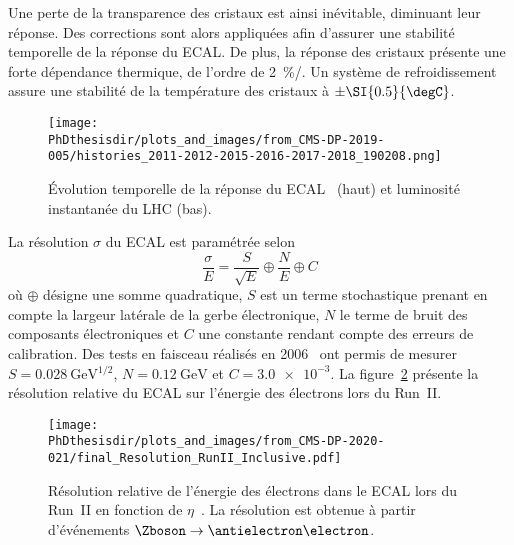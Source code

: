 Une perte de la transparence des cristaux est ainsi inévitable, diminuant leur réponse.
Des corrections sont alors appliquées afin d'assurer une stabilité temporelle de la réponse du ECAL.
De plus, la réponse des cristaux présente une forte dépendance thermique, de l'ordre de \SI{2}{\%/\degC}.
Un système de refroidissement assure une stabilité de la température des cristaux à $\pm\SI{0.5}{\degC}$.
\begin{figure}[h]
\centering
\texttt{[image: \\PhDthesisdir/plots\_and\_images/from\_CMS-DP-2019-005/histories\_2011-2012-2015-2016-2017-2018\_190208.png]}
\caption[Évolution temporelle de la réponse du ECAL.]{Évolution temporelle de la réponse du ECAL~\cite{CMS-DP-2019-005} (haut) et luminosité instantanée du LHC (bas).}
\label{fig-chapter-LHC-section-CMS-subsec-ECAL-CMS-DP-2019-005-histories_2011-2012-2015-2016-2017-2018_190208}
\end{figure}
\par La résolution $\sigma$ du ECAL est paramétrée selon
\begin{equation}
\frac{\sigma}{E}
=
\frac{S}{\sqrt{E}}
\oplus
\frac{N}{E}
\oplus
C
\end{equation}
où $\oplus$ désigne une somme quadratique,
$S$ est un terme stochastique prenant en compte la largeur latérale de la gerbe électronique,
$N$ le terme de bruit des composants électroniques et
$C$ une constante rendant compte des erreurs de calibration.
Des tests en faisceau réalisés en 2006~\cite{cms_paper} ont permis de mesurer
$S = \SI{0.028}{\GeV^{1/2}}$,
$N = \SI{0.12}{\GeV}$ et
$C = \num{3.0e-3}$.
La figure~\ref{fig-chapter-LHC-section-CMS-subsec-ECAL-CMS-DP-2020-021-final_Resolution_RunII_Inclusive} présente la résolution relative du ECAL sur l'énergie des électrons lors du Run~II.
\begin{figure}[h]
\centering
\texttt{[image: \\PhDthesisdir/plots\_and\_images/from\_CMS-DP-2020-021/final\_Resolution\_RunII\_Inclusive.pdf]}
\caption[Résolution relative de l'énergie des électrons dans le ECAL lors du Run~II.]{Résolution relative de l'énergie des électrons dans le ECAL lors du Run~II en fonction de $\eta$~\cite{CMS-DP-2020-021}. La résolution est obtenue à partir d'événements $\Zboson\to\antielectron\electron$.}
\label{fig-chapter-LHC-section-CMS-subsec-ECAL-CMS-DP-2020-021-final_Resolution_RunII_Inclusive}
\end{figure}